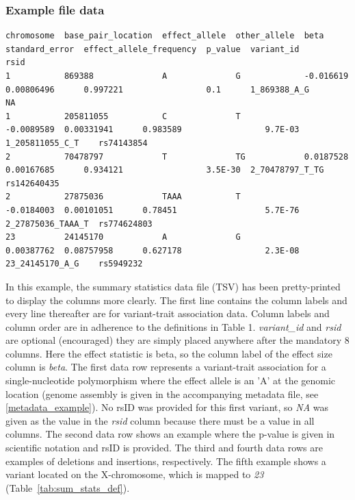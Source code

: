 \documentclass[11pt]{article}
\begin{document}
\begin{landscape}
\subsubsection{Example file data}
\scriptsize
\begin{verbatim}
chromosome  base_pair_location  effect_allele  other_allele  beta        standard_error  effect_allele_frequency  p_value  variant_id         rsid
1           869388              A              G             -0.016619   0.00806496      0.997221                 0.1      1_869388_A_G       NA
1           205811055           C              T             -0.0089589  0.00331941      0.983589                 9.7E-03  1_205811055_C_T    rs74143854
2           70478797            T              TG            0.0187528   0.00167685      0.934121                 3.5E-30  2_70478797_T_TG    rs142640435
2           27875036            TAAA           T             -0.0184003  0.00101051      0.78451                  5.7E-76  2_27875036_TAAA_T  rs774624803
23          24145170            A              G             0.00387762  0.08757958      0.627178                 2.3E-08  23_24145170_A_G    rs5949232
\end{verbatim}

\normalsize
        In this example, the summary statistics data file (TSV) has been pretty-printed to display the columns more clearly. The first line contains the column labels and every line thereafter are for variant-trait association data. Column labels and column order are in adherence to the definitions in Table 1. \textit{variant\_id} and \textit{rsid} are optional (encouraged) they are simply placed anywhere after the mandatory 8 columns. Here the effect statistic is beta, so the column label of the effect size column is \textit{beta}. The first data row represents a variant-trait association for a single-nucleotide polymorphism where the effect allele is an 'A' at the genomic location (genome assembly is given in the accompanying metadata file, see \ref{metadata_example}). No rsID was provided for this first variant, so \textit{NA} was given as the value in the \textit{rsid} column because there must be a value in all columns. The second data row shows an example where the p-value is given in scientific notation and rsID is provided. The third and fourth data rows are examples of deletions and insertions, respectively. The fifth example shows a variant located on the X-chromosome, which is mapped to \textit{23} (Table~\ref{tab:sum_stats_def}).
\end{landscape}
\end{document}
